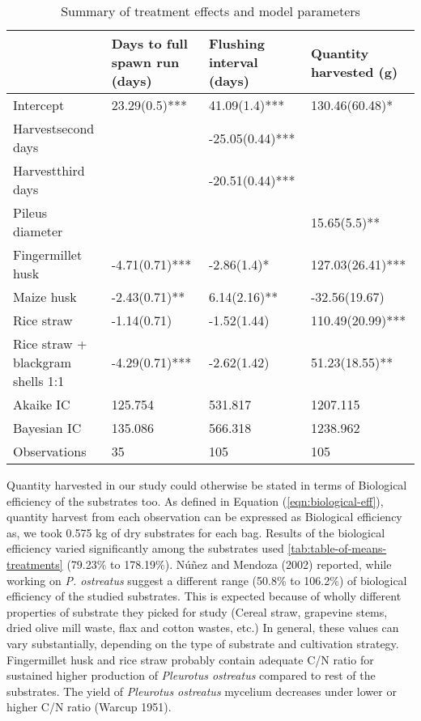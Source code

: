 \documentclass[]{article}
\begin{document}
\begingroup\fontsize{8}{10}\selectfont

\begin{longtable}{llll}
\caption{\label{tab:qh-fsr-summary}Summary of treatment effects and model parameters}\\
\toprule
  & Days to full spawn run (days) & Flushing interval (days) & Quantity harvested (g)\\
\midrule
Intercept & 23.29(0.5)*** & 41.09(1.4)*** & 130.46(60.48)*\\
Harvestsecond days &  & -25.05(0.44)*** & \\
Harvestthird days &  & -20.51(0.44)*** & \\
Pileus diameter &  &  & 15.65(5.5)**\\
Fingermillet husk & -4.71(0.71)*** & -2.86(1.4)* & 127.03(26.41)***\\
\addlinespace
Maize husk & -2.43(0.71)** & 6.14(2.16)** & -32.56(19.67)\\
Rice straw & -1.14(0.71) & -1.52(1.44) & 110.49(20.99)***\\
Rice straw + blackgram shells 1:1 & -4.29(0.71)*** & -2.62(1.42) & 51.23(18.55)**\\
\hline
Akaike IC & 125.754 & 531.817 & 1207.115\\
Bayesian IC & 135.086 & 566.318 & 1238.962\\
\addlinespace
Observations & 35 & 105 & 105\\
\bottomrule
\end{longtable}
\endgroup{}

Quantity harvested in our study could otherwise be stated in terms of Biological efficiency of the substrates too. As defined in Equation (\ref{eqn:biological-eff}), quantity harvest from each observation can be expressed as Biological efficiency as, we took 0.575 kg of dry substrates for each bag. Results of the biological efficiency varied significantly among the substrates used \ref{tab:table-of-means-treatments} (79.23\% to 178.19\%). Núñez and Mendoza (2002) reported, while working on \textit{P. ostreatus} suggest a different range (50.8\% to 106.2\%) of biological efficiency of the studied substrates. This is expected because of wholly different properties of substrate they picked for study (Cereal straw, grapevine stems, dried olive mill waste, flax and cotton wastes, etc.) In general, these values can vary substantially, depending on the type of substrate and cultivation strategy. Fingermillet husk and rice straw probably contain adequate C/N ratio for sustained higher production of \textit{Pleurotus ostreatus} compared to rest of the substrates. The yield of \textit{Pleurotus ostreatus} mycelium decreases under lower or higher C/N ratio (Warcup 1951).
\end{document}
